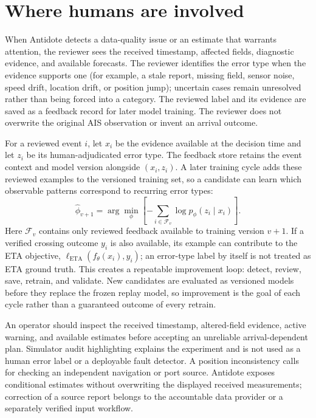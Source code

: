 \documentclass[11pt]{article}
\begin{document}
\section{Where humans are involved}
When Antidote detects a data-quality issue or an estimate that warrants attention, the reviewer sees the received timestamp, affected fields, diagnostic evidence, and available forecasts. The reviewer identifies the error type when the evidence supports one (for example, a stale report, missing field, sensor noise, speed drift, location drift, or position jump); uncertain cases remain unresolved rather than being forced into a category. The reviewed label and its evidence are saved as a feedback record for later model training. The reviewer does not overwrite the original AIS observation or invent an arrival outcome.

For a reviewed event $i$, let $x_i$ be the evidence available at the decision time and let $z_i$ be its human-adjudicated error type. The feedback store retains the event context and model version alongside $(x_i,z_i)$. A later training cycle adds these reviewed examples to the versioned training set, so a candidate can learn which observable patterns correspond to recurring error types:
\[
 \widehat\phi_{v+1}=\arg\min_{\phi}\left[-\sum_{i\in\mathcal F_v}\log p_{\phi}(z_i\mid x_i)\right].
\]
Here $\mathcal F_v$ contains only reviewed feedback available to training version $v+1$. If a verified crossing outcome $y_i$ is also available, its example can contribute to the ETA objective, $\ell_{\mathrm{ETA}}(f_{\theta}(x_i),y_i)$; an error-type label by itself is not treated as ETA ground truth. This creates a repeatable improvement loop: detect, review, save, retrain, and validate. New candidates are evaluated as versioned models before they replace the frozen replay model, so improvement is the goal of each cycle rather than a guaranteed outcome of every retrain.

An operator should inspect the received timestamp, altered-field evidence, active warning, and available estimates before accepting an unreliable arrival-dependent plan. Simulator audit highlighting explains the experiment and is not used as a human error label or a deployable fault detector. A position inconsistency calls for checking an independent navigation or port source. Antidote exposes conditional estimates without overwriting the displayed received measurements; correction of a source report belongs to the accountable data provider or a separately verified input workflow.
\end{document}
